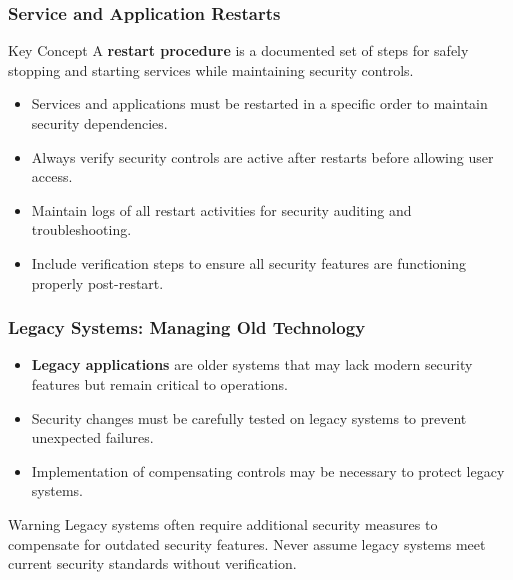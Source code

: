 \documentclass{beamer}
\begin{document}
            \begin{frame}
                \frametitle{Service and Application Restarts}
                \begin{block}{Key Concept}
                A \textbf{restart procedure} is a documented set of steps for safely stopping and starting services while maintaining security controls.
                \end{block}
                \begin{itemize}
                    \item Services and applications must be restarted in a specific order to maintain security dependencies.
                    
                    \item Always verify security controls are active after restarts before allowing user access.
                    
                    \item Maintain logs of all restart activities for security auditing and troubleshooting.
                    
                    \item Include verification steps to ensure all security features are functioning properly post-restart.
                \end{itemize}
                \end{frame}
                
                \begin{frame}
                \frametitle{Legacy Systems: Managing Old Technology}
                \begin{itemize}
                    \item \textbf{Legacy applications} are older systems that may lack modern security features but remain critical to operations.
                    
                    \item Security changes must be carefully tested on legacy systems to prevent unexpected failures.
                    
                    \item Implementation of compensating controls may be necessary to protect legacy systems.
                \end{itemize}
                \begin{alertblock}{Warning}
                Legacy systems often require additional security measures to compensate for outdated security features. Never assume legacy systems meet current security standards without verification.
                \end{alertblock}
                \end{frame}
                
\end{document}

